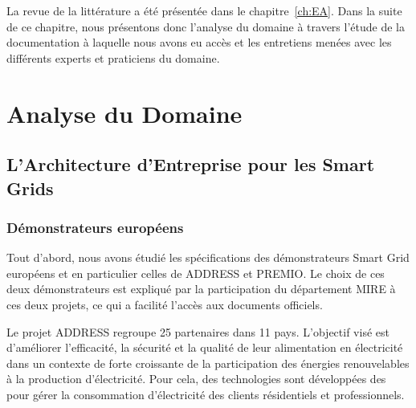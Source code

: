 La revue de la littérature a été présentée dans le chapitre~\ref{ch:EA}.
Dans la suite de ce chapitre, nous présentons donc l'analyse du domaine à travers l'étude
de la documentation à laquelle nous avons eu accès et les entretiens menées avec les différents
experts et praticiens du domaine.












\section{Analyse du Domaine}

    \subsection{L'Architecture d'Entreprise pour les Smart Grids}
    \subsubsection{Démonstrateurs européens}
    \label{sec:DemonstrateursSG}

Tout d'abord, nous avons étudié les spécifications des démonstrateurs Smart Grid
européens et en particulier celles de ADDRESS et PREMIO. Le choix de ces deux
démonstrateurs est expliqué par la participation du département MIRE à ces deux
projets, ce qui a facilité l'accès aux documents officiels.



Le projet ADDRESS regroupe 25 partenaires dans 11 pays. L'objectif visé est
d'améliorer l'efficacité, la sécurité et la qualité de leur alimentation en
électricité dans un contexte de forte croissante de la participation des
énergies renouvelables à la production d'électricité. Pour cela, des
technologies sont développées des pour gérer la consommation d'électricité des
clients résidentiels et professionnels.

